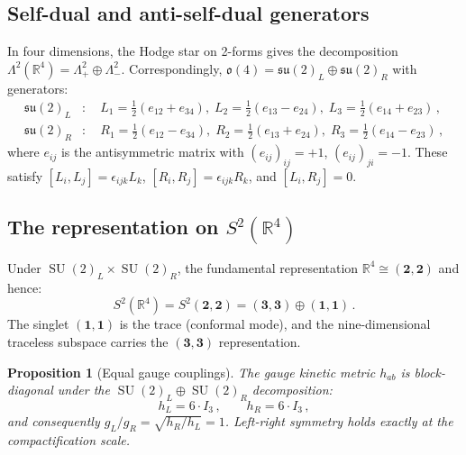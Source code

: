 \documentclass[12pt,a4paper]{article}
\newtheorem{proposition}[theorem]{Proposition}
\theoremstyle{definition}
\newcommand{\SU}{\operatorname{SU}}
\newcommand{\R}{\mathbb{R}}
\begin{document}
\subsection{Self-dual and anti-self-dual generators}

In four dimensions, the Hodge star on 2-forms gives the decomposition $\Lambda^2(\R^4) = \Lambda^2_+ \oplus \Lambda^2_-$.
Correspondingly, $\mathfrak{o}(4) = \mathfrak{su}(2)_L \oplus \mathfrak{su}(2)_R$ with generators:
\begin{align}
\label{eq:su2_generators}
\mathfrak{su}(2)_L&\colon\quad L_1 = \tfrac{1}{2}(e_{12} + e_{34}),\; L_2 = \tfrac{1}{2}(e_{13} - e_{24}),\; L_3 = \tfrac{1}{2}(e_{14} + e_{23})\,,\\
\mathfrak{su}(2)_R&\colon\quad R_1 = \tfrac{1}{2}(e_{12} - e_{34}),\; R_2 = \tfrac{1}{2}(e_{13} + e_{24}),\; R_3 = \tfrac{1}{2}(e_{14} - e_{23})\,,
\end{align}
where $e_{ij}$ is the antisymmetric matrix with $(e_{ij})_{ij} = +1$, $(e_{ij})_{ji} = -1$.
These satisfy $[L_i, L_j] = \epsilon_{ijk} L_k$, $[R_i, R_j] = \epsilon_{ijk} R_k$, and $[L_i, R_j] = 0$.

\subsection{The representation on \texorpdfstring{$S^2(\R^4)$}{S²(R⁴)}}

Under $\SU(2)_L \times \SU(2)_R$, the fundamental representation $\R^4 \cong (\mathbf{2}, \mathbf{2})$ and hence:
\begin{equation}
S^2(\R^4) = S^2(\mathbf{2},\mathbf{2}) = (\mathbf{3},\mathbf{3}) \oplus (\mathbf{1},\mathbf{1})\,.
\end{equation}
The singlet $(\mathbf{1},\mathbf{1})$ is the trace (conformal mode), and the nine-dimensional traceless subspace carries the $(\mathbf{3},\mathbf{3})$ representation.

\begin{proposition}[Equal gauge couplings]
\label{prop:equal_couplings}
The gauge kinetic metric $h_{ab}$ is block-diagonal under the $\SU(2)_L \oplus \SU(2)_R$ decomposition:
\begin{equation}
h_L = 6\cdot I_3\,,\qquad h_R = 6\cdot I_3\,,
\end{equation}
and consequently $g_L/g_R = \sqrt{h_R/h_L} = 1$.
Left-right symmetry holds exactly at the compactification scale.
\end{proposition}
\end{document}
